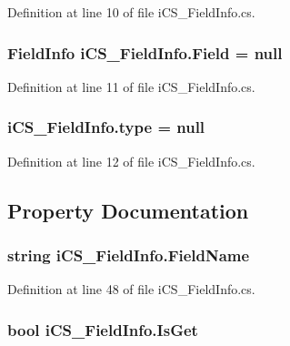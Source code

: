 Definition at line 10 of file i\+C\+S\+\_\+\+Field\+Info.\+cs.

\hypertarget{classi_c_s___field_info_ada380e14b9b7de31ea12a63e676de1e8}{
\subsubsection[{Field}]{\setlength{\rightskip}{0pt plus 5cm}Field\+Info i\+C\+S\+\_\+\+Field\+Info.\+Field = null}}\label{classi_c_s___field_info_ada380e14b9b7de31ea12a63e676de1e8}


Definition at line 11 of file i\+C\+S\+\_\+\+Field\+Info.\+cs.

\hypertarget{classi_c_s___field_info_aa8277d721ae4730d8202cd87ba33f437}{
\subsubsection[{type}]{ i\+C\+S\+\_\+\+Field\+Info.\+type = null}}\label{classi_c_s___field_info_aa8277d721ae4730d8202cd87ba33f437}


Definition at line 12 of file i\+C\+S\+\_\+\+Field\+Info.\+cs.



\subsection{Property Documentation}
\hypertarget{classi_c_s___field_info_afe5329490e9923b7a1eeefa4c99e53d2}{
\subsubsection[{Field\+Name}]{\setlength{\rightskip}{0pt plus 5cm}string i\+C\+S\+\_\+\+Field\+Info.\+Field\+Name\hspace{0.3cm}{\ttfamily [get]}}}\label{classi_c_s___field_info_afe5329490e9923b7a1eeefa4c99e53d2}


Definition at line 48 of file i\+C\+S\+\_\+\+Field\+Info.\+cs.

\hypertarget{classi_c_s___field_info_a98926fd021735f22ddff072992539fb6}{
\subsubsection[{Is\+Get}]{\setlength{\rightskip}{0pt plus 5cm}bool i\+C\+S\+\_\+\+Field\+Info.\+Is\+Get\hspace{0.3cm}{\ttfamily [get]}}}\label{classi_c_s___field_info_a98926fd021735f22ddff072992539fb6}



